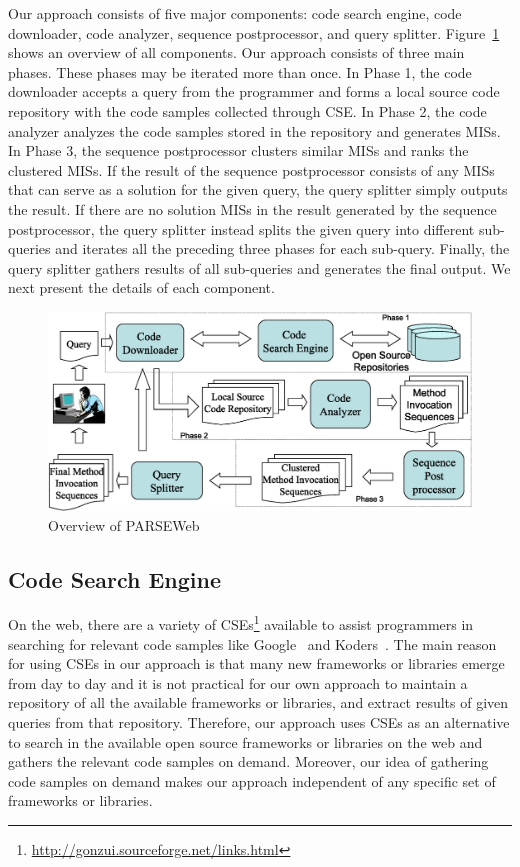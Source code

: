 \documentclass{fp035-thummalapenta}
\begin{document}
Our approach consists of five major components: code search engine,
code downloader, code analyzer, sequence postprocessor, and query splitter.
Figure~\ref{fig:architecture} shows an overview of all components.
Our approach consists of three main phases.
These phases may be iterated more than once. In Phase
1, the code downloader accepts a query from the programmer and forms
a local source code repository with the code samples collected
through CSE. In Phase 2, the code analyzer analyzes the code samples
stored in the repository and generates MISs. In Phase 3, the
sequence postprocessor clusters similar MISs and ranks the clustered MISs.
If the result of the sequence postprocessor consists of any MISs that can
serve as a solution for the given query, the query splitter simply
outputs the result. If there are no solution MISs in the result
generated by the sequence postprocessor, the query splitter instead splits
the given query into different sub-queries and iterates all the
preceding three phases for each sub-query. Finally, the query
splitter gathers results of all sub-queries and generates the final
output. We next present the details of each component.
\begin{figure}[t]
\centering
\includegraphics[scale=0.32,clip]{PARSEWeb_overview_new.eps}\vspace*{-1ex}
\caption{Overview of PARSEWeb} \label{fig:architecture}
\vspace*{-2ex}
\end{figure}
\subsection{Code Search Engine}

On the web, there are a variety of
CSEs\footnote{\url{http://gonzui.sourceforge.net/links.html}}
available to assist programmers in searching for relevant code
samples like Google~\cite{GCSE} and Koders~\cite{KODERS}. The main reason for using CSEs in our
approach is that many new frameworks or libraries emerge from day to
day and it is not practical for our own approach to maintain a
repository of all the available frameworks or libraries, and extract
results of given queries from that repository. Therefore, our
approach uses CSEs as an alternative to search in the available open
source frameworks or libraries on the web and gathers the relevant
code samples on demand. Moreover, our idea of gathering code samples
on demand makes our approach independent of any specific set of
frameworks or libraries.
\end{document}
